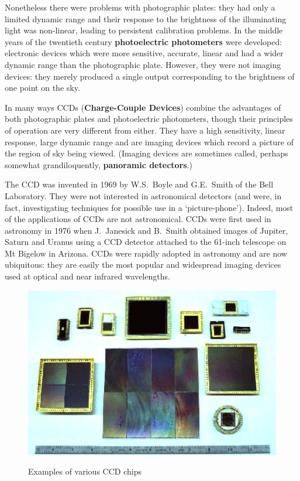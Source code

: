 \documentclass[twoside,11pt]{article}
\begin{document}
Nonetheless there were problems with photographic plates: they had only
a limited dynamic range and their response to the brightness of the
illuminating light was non-linear, leading to persistent calibration
problems.  In the middle years of the twentieth century {\bf photoelectric
photometers} were developed: electronic devices which were more sensitive,
accurate, linear and had a wider dynamic range than the photographic
plate.  However, they were not imaging devices: they merely produced a
single output corresponding to the brightness of one point on the sky.

In many ways CCDs ({\bf Charge-Couple Devices}) combine the advantages
of both photographic plates and photoelectric photometers, though their
principles of operation are very different from either.  They have a high
sensitivity, linear response, large dynamic range and are imaging devices
which record a picture of the region of sky being viewed.  (Imaging devices
are sometimes called, perhaps somewhat grandiloquently, {\bf panoramic
detectors}.)

The CCD was invented in 1969 by W.S.~Boyle and G.E.~Smith of the Bell
Laboratory.  They were not interested in astronomical detectors (and were,
in fact, investigating techniques for possible use in a `picture-phone').
Indeed, most of the applications of CCDs are not astronomical.  CCDs
were first used in astronomy in 1976 when J.~Janesick and B.~Smith
obtained images of Jupiter, Saturn and Uranus using a CCD detector
attached to the 61-inch telescope on Mt Bigelow in Arizona.  CCDs were
rapidly adopted in astronomy and are now ubiquitous: they are easily
the most popular and widespread imaging devices used at optical and
near infrared wavelengths.

\begin{figure}[htbp]
   \centering
   \includegraphics[totalheight=4in]{sc5_ccdlup.ps}
   \begin{quote}
   \caption{Examples of various CCD chips
   \label{CCDLUP} }
   \end{quote}
\end{figure}
\end{document}
